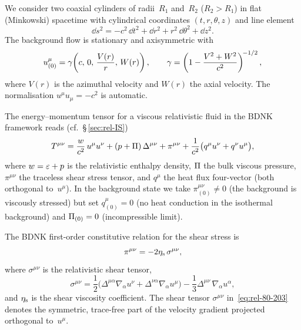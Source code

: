 We consider two coaxial cylinders of radii~$R_{1}$ and~$R_{2}$
($R_{2}>R_{1}$) in flat (Minkowski) spacetime with cylindrical
coordinates $(t,r,\theta,z)$ and line element
\begin{equation}
\label{eq:rel-80-200}
\dd s^{2} = -c^{2}\,\dd t^{2} + \dd r^{2} + r^{2}\,\dd\theta^{2}
            + \dd z^{2}.
\end{equation}
The background flow is stationary and axisymmetric with
\begin{equation}
\label{eq:rel-80-201}
u^{\mu}_{(0)} = \gamma\!\left(c,\,0,\,\frac{V(r)}{r},\,W(r)\right),
\qquad
\gamma = \left(1 - \frac{V^{2}+W^{2}}{c^{2}}\right)^{\!-1/2},
\end{equation}
where $V(r)$ is the azimuthal velocity and $W(r)$ the axial velocity.
The normalisation $u^{\mu}u_{\mu}=-c^{2}$ is automatic.

The energy--momentum tensor for a viscous relativistic fluid in the
BDNK framework reads (cf.\ \S\,\ref{sec:rel-IS})
\begin{equation}
\label{eq:rel-80-202}
T^{\mu\nu} = \frac{w}{c^{2}}\,u^{\mu}u^{\nu}
  + (p+\Pi)\,\Delta^{\mu\nu}
  + \pi^{\mu\nu}
  + \frac{1}{c^{2}}\bigl(q^{\mu}u^{\nu}+q^{\nu}u^{\mu}\bigr),
\end{equation}
where $w=\varepsilon+p$ is the relativistic enthalpy density,
$\Pi$ the bulk viscous pressure, $\pi^{\mu\nu}$ the traceless
shear stress tensor, and $q^{\mu}$ the heat flux four-vector
(both orthogonal to~$u^{\mu}$).  In the background state we take
$\pi^{\mu\nu}_{(0)}\ne 0$ (the background is viscously stressed) but
set $q^{\mu}_{(0)}=0$ (no heat conduction in the isothermal
background) and $\Pi_{(0)}=0$ (incompressible limit).

The BDNK first-order constitutive relation for the shear stress is
\begin{equation}
\label{eq:rel-80-203}
\pi^{\mu\nu}
  = -2\eta_{\mathrm{s}}\,\sigma^{\mu\nu},
\end{equation}
where $\sigma^{\mu\nu}$ is the relativistic shear tensor,
\begin{equation}
\label{eq:rel-80-204}
\sigma^{\mu\nu}
  = \frac{1}{2}\bigl(\Delta^{\mu\alpha}\nabla_{\!\alpha}u^{\nu}
    + \Delta^{\nu\alpha}\nabla_{\!\alpha}u^{\mu}\bigr)
  - \frac{1}{3}\Delta^{\mu\nu}\,\nabla_{\!\alpha}u^{\alpha},
\end{equation}
and $\eta_{\mathrm{s}}$ is the shear viscosity coefficient.  The shear tensor
$\sigma^{\mu\nu}$ in~\eqref{eq:rel-80-203} denotes the symmetric, trace-free
part of the velocity gradient projected orthogonal to~$u^{\mu}$.


